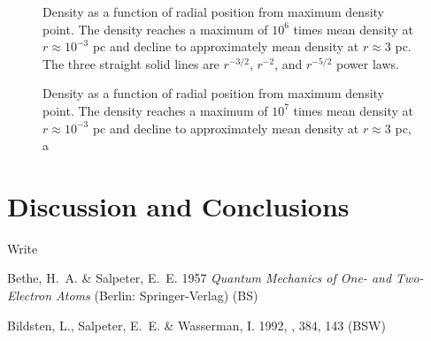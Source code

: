 \documentclass{emulateapj}
\begin{document}
\begin{figure}
\end{figure}

\begin{figure}
\caption{Density as a function of radial position from maximum density point.  The density reaches a maximum of $10^6$ times mean density at $r \approx 10^{-3}$ pc and decline to approximately mean density at $r\approx 3$ pc.  The three straight solid lines are $r^{-3/2}$, $r^{-2}$, and $r^{-5/2}$ power laws. }
\end{figure}

\begin{figure}
\caption{Density as a function of radial position from maximum density point.  The density reaches a maximum of $10^7$ times mean density at $r \approx 10^{-3}$ pc and decline to approximately mean density at $r\approx 3$ pc, a }
\end{figure}

\section{Discussion and Conclusions}

\acknowledgments

Write

\begin{references}

\noindent
Bethe, H.~A. \& Salpeter, E.~E. 1957 \textit{Quantum Mechanics of One-
  and Two-Electron Atoms} (Berlin: Springer-Verlag) (BS) 

\noindent
Bildsten, L., Salpeter, E.~E. \& Wasserman, I. 1992, \apj, 384, 143
(BSW) 


\end{references}
\end{document}
